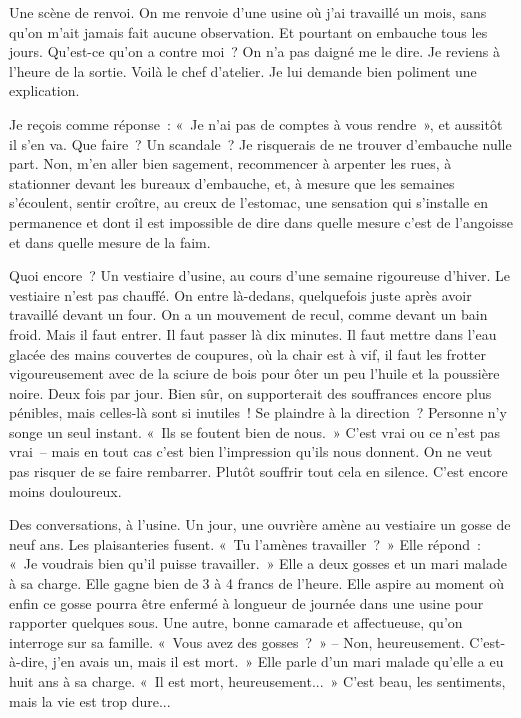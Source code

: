 \documentclass[french,twoside]{book} %
\begin{document}
Une scène de renvoi. On me renvoie d'une usine où j'ai travaillé un mois, sans qu’on m'ait jamais fait aucune observation. Et pourtant on embauche tous les jours. Qu'est-ce qu'on a contre moi ? On n'a pas daigné me le dire. Je reviens à l'heure de la sortie. Voilà le chef d'atelier. Je lui demande bien poliment une explication.\par
Je reçois comme réponse : « Je n'ai pas de comptes à vous rendre », et aussitôt il s'en va. Que faire ? Un scandale ? Je risquerais de ne trouver d'embauche nulle part. Non, m'en aller bien sagement, recommencer à arpenter les rues, à stationner devant les bureaux d'embauche, et, à mesure que les semaines s'écoulent, sentir croître, au creux de l'estomac, une sensation qui s'installe en permanence et dont il est impossible de dire dans quelle mesure c'est de l'angoisse et dans quelle mesure de la faim.\par
Quoi encore ? Un vestiaire d'usine, au cours d'une semaine rigoureuse d'hiver. Le vestiaire n'est pas chauffé. On entre là-dedans, quelquefois juste après avoir travaillé devant un four. On a un mouvement de recul, comme devant un bain froid. Mais il faut entrer. Il faut passer là dix minutes. Il faut mettre dans l'eau glacée des mains couvertes de coupures, où la chair est à vif, il faut les frotter vigoureusement avec de la sciure de bois pour ôter un peu l'huile et la poussière noire. Deux fois par jour. Bien sûr, on supporterait des souffrances encore plus pénibles, mais celles-là sont si inutiles ! Se plaindre à la direction ? Personne n'y songe un seul instant. « Ils se foutent bien de nous. » C'est vrai ou ce n'est pas vrai – mais en tout cas c'est bien l'impression qu'ils nous donnent. On ne veut pas risquer de se faire rembarrer. Plutôt souffrir tout cela en silence. C'est encore moins douloureux.\par
Des conversations, à l'usine. Un jour, une ouvrière amène au vestiaire un gosse de neuf ans. Les plaisanteries fusent. « Tu l'amènes travailler ? » Elle répond : « Je voudrais bien qu'il puisse travailler. » Elle a deux gosses et un mari malade à sa charge. Elle gagne bien de 3 à 4 francs de l'heure. Elle aspire au moment où enfin ce gosse pourra être enfermé à longueur de journée dans une usine pour rapporter quelques sous. Une autre, bonne camarade et affectueuse, qu'on interroge sur sa famille. « Vous avez des gosses ? » – Non, heureusement. C'est-à-dire, j'en avais un, mais il est mort. » Elle parle d'un mari malade qu'elle a eu huit ans à sa charge. « Il est mort, heureusement... » C'est beau, les sentiments, mais la vie est trop dure...\par
\end{document}
